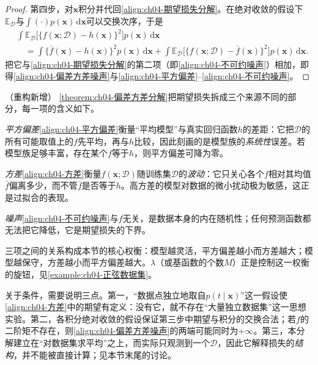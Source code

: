 \documentclass[../../main.tex]{subfiles}
\begin{document}
\begin{proof}
第四步，对$\boldsymbol{x}$积分并代回\eqref{align:ch04-期望损失分解}。在绝对收敛的假设下$\mathbb{E}_{\mathcal{D}}$与$\int(\cdot)p(\boldsymbol{x})\,\mathrm{d}\boldsymbol{x}$可以交换次序，于是
\begin{align*}
  &\int\mathbb{E}_{\mathcal{D}}\bigl[\{f(\boldsymbol{x};\mathcal{D})-h(\boldsymbol{x})\}^2\bigr]p(\boldsymbol{x})\,\mathrm{d}\boldsymbol{x}\\
  &\quad=\int\{\bar{f}(\boldsymbol{x})-h(\boldsymbol{x})\}^2p(\boldsymbol{x})\,\mathrm{d}\boldsymbol{x}
  +\int\mathbb{E}_{\mathcal{D}}\bigl[\{f(\boldsymbol{x};\mathcal{D})-\bar{f}(\boldsymbol{x})\}^2\bigr]p(\boldsymbol{x})\,\mathrm{d}\boldsymbol{x}.
\end{align*}
把它与\eqref{align:ch04-期望损失分解}的第二项（即\eqref{align:ch04-不可约噪声}）相加，即得\eqref{align:ch04-偏差方差噪声}与\eqref{align:ch04-平方偏差}--\eqref{align:ch04-不可约噪声}。
\end{proof}

\begin{remark}（重构新增）
\cref{theorem:ch04-偏差方差分解}把期望损失拆成三个来源不同的部分，每一项的含义如下。

\emph{平方偏差}\eqref{align:ch04-平方偏差}衡量“平均模型”与真实回归函数$h$的差距：它把$\mathcal{D}$的所有可能取值上的$f$先平均，再与$h$比较，因此刻画的是模型族的\emph{系统性}误差。若模型族足够丰富，存在某个$f$等于$h$，则平方偏差可降为零。

\emph{方差}\eqref{align:ch04-方差}衡量$f(\boldsymbol{x};\mathcal{D})$随训练集$\mathcal{D}$的\emph{波动}：它只关心各个$f$相对其均值$\bar{f}$偏离多少，而不管$\bar{f}$是否等于$h$。高方差的模型对数据的微小扰动极为敏感，这正是过拟合的表现。

\emph{噪声}\eqref{align:ch04-不可约噪声}与$f$无关，是数据本身的内在随机性；任何预测函数都无法把它降低，它是期望损失的下界。

三项之间的关系构成本节的核心权衡：模型越灵活，平方偏差越小而方差越大；模型越保守，方差越小而平方偏差越大。$\lambda$（或基函数的个数$M$）正是控制这一权衡的旋钮，见\cref{example:ch04-正弦数据集}。

关于条件，需要说明三点。第一，“数据点独立地取自$p(t\mid\boldsymbol{x})$”这一假设使\eqref{align:ch04-方差}中的期望有定义：没有它，就不存在“大量独立数据集”这一思想实验。第二，各积分绝对收敛的假设保证第三步中期望与积分的交换合法；若$f$的二阶矩不存在，则\eqref{align:ch04-偏差方差噪声}的两端可能同时为$+\infty$。第三，本分解建立在“对数据集求平均”之上，而实际只观测到一个$\mathcal{D}$，因此它解释损失的\emph{结构}，并不能被直接计算；见本节末尾的讨论。
\end{remark}
\end{document}
